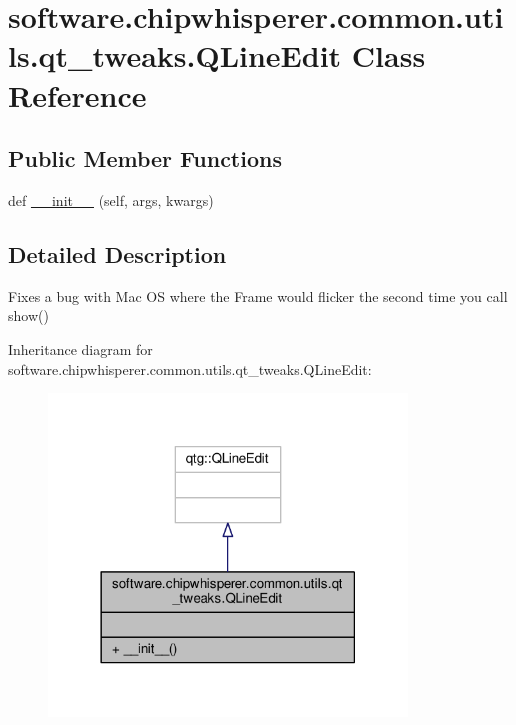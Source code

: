 \hypertarget{classsoftware_1_1chipwhisperer_1_1common_1_1utils_1_1qt__tweaks_1_1QLineEdit}{}\section{software.\+chipwhisperer.\+common.\+utils.\+qt\+\_\+tweaks.\+Q\+Line\+Edit Class Reference}
\label{classsoftware_1_1chipwhisperer_1_1common_1_1utils_1_1qt__tweaks_1_1QLineEdit}
\subsection*{Public Member Functions}
\begin{DoxyCompactItemize}
\item 
def \hyperlink{classsoftware_1_1chipwhisperer_1_1common_1_1utils_1_1qt__tweaks_1_1QLineEdit_a58754818c0ff325a27bb243e4d942740}{\+\_\+\+\_\+init\+\_\+\+\_\+} (self, args, kwargs)
\end{DoxyCompactItemize}


\subsection{Detailed Description}
\begin{DoxyVerb}Fixes a bug with Mac OS where the Frame would flicker the second time you call show()\end{DoxyVerb}
 

Inheritance diagram for software.\+chipwhisperer.\+common.\+utils.\+qt\+\_\+tweaks.\+Q\+Line\+Edit\+:\nopagebreak
\begin{figure}[H]
\begin{center}
\leavevmode
\includegraphics[width=270pt]{da/d35/classsoftware_1_1chipwhisperer_1_1common_1_1utils_1_1qt__tweaks_1_1QLineEdit__inherit__graph}
\end{center}
\end{figure}


